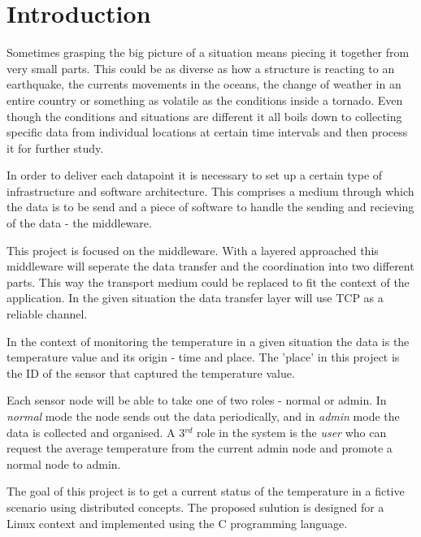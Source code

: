 \section{Introduction}
\label{sec:intro}

Sometimes grasping the big picture of a situation means piecing it together from very small parts. This could be as diverse as how a structure is reacting to an earthquake, the currents movements in the oceans, the change of weather in an entire country or something as volatile as the conditions inside a tornado.
Even though the conditions and situations are different it all boils down to collecting specific data from individual locations at certain time intervals and then process it for further study.

In order to deliver each datapoint it is necessary to set up a certain type of infrastructure and software architecture. This comprises a medium through which the data is to be send and a piece of software to handle the sending and recieving of the data - the middleware.

This project is focused on the middleware. With a layered approached this middleware will seperate the data transfer and the coordination into two different parts. This way the transport medium could be replaced to fit the context of the application. In the given situation the data transfer layer will use TCP as a reliable channel.

In the context of monitoring the temperature in a given situation the data is the temperature value and its origin - time and place. The 'place' in this project is the ID of the sensor that captured the temperature value. 

Each sensor node will be able to take one of two roles - normal or admin. In \textit{normal} mode the node sends out the data periodically, and in \textit{admin} mode the data is collected and organised. A 3$^{rd}$ role in the system is the \textit{user} who can request the average temperature from the current admin node and promote a normal node to admin. 

The goal of this project is to get a current status of the temperature in a fictive scenario using distributed concepts. 
The proposed sulution is designed for a Linux context and implemented using the C programming language. 
 
